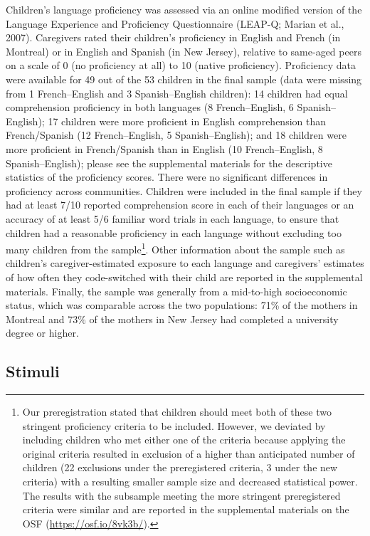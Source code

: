 \documentclass[
  man,floatsintext]{apa7}
\begin{document}
Children's language proficiency was assessed via an online modified version of the Language Experience and Proficiency Questionnaire (LEAP-Q; Marian et al., 2007). Caregivers rated their children's proficiency in English and French (in Montreal) or in English and Spanish (in New Jersey), relative to same-aged peers on a scale of 0 (no proficiency at all) to 10 (native proficiency). Proficiency data were available for 49 out of the 53 children in the final sample (data were missing from 1 French--English and 3 Spanish--English children): 14 children had equal comprehension proficiency in both languages (8 French--English, 6 Spanish--English); 17 children were more proficient in English comprehension than French/Spanish (12 French--English, 5 Spanish--English); and 18 children were more proficient in French/Spanish than in English (10 French--English, 8 Spanish--English); please see the supplemental materials for the descriptive statistics of the proficiency scores. There were no significant differences in proficiency across communities. Children were included in the final sample if they had at least 7/10 reported comprehension score in each of their languages or an accuracy of at least 5/6 familiar word trials in each language, to ensure that children had a reasonable proficiency in each language without excluding too many children from the sample\footnote{Our preregistration stated that children should meet both of these two stringent proficiency criteria to be included. However, we deviated by including children who met either one of the criteria because applying the original criteria resulted in exclusion of a higher than anticipated number of children (22 exclusions under the preregistered criteria, 3 under the new criteria) with a resulting smaller sample size and decreased statistical power. The results with the subsample meeting the more stringent preregistered criteria were similar and are reported in the supplemental materials on the OSF (\url{https://osf.io/8vk3b/}).}. Other information about the sample such as children's caregiver-estimated exposure to each language and caregivers' estimates of how often they code-switched with their child are reported in the supplemental materials. Finally, the sample was generally from a mid-to-high socioeconomic status, which was comparable across the two populations: 71\% of the mothers in Montreal and 73\% of the mothers in New Jersey had completed a university degree or higher.

\hypertarget{stimuli}{%
\subsection{Stimuli}\label{stimuli}}
\end{document}
